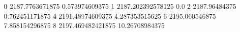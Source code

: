 0 2187.7763671875 0.573974609375
1 2187.202392578125 0.0
2 2187.96484375 0.762451171875
4 2191.48974609375 4.287353515625
6 2195.060546875 7.858154296875
8 2197.469482421875 10.26708984375
